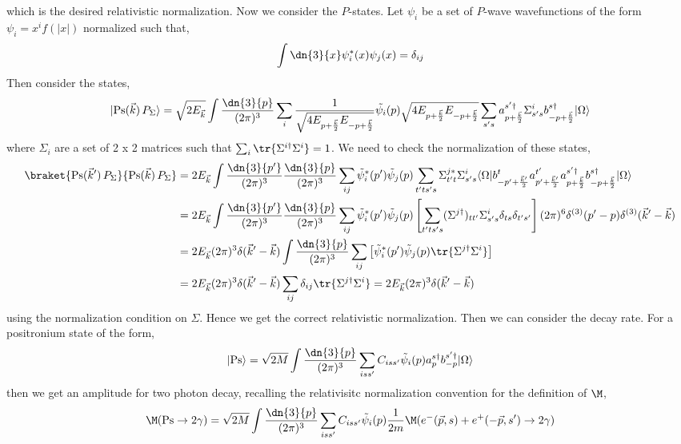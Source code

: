 \documentclass[12pt]{article}
\DeclarePairedDelimiter\bra{\langle}{\rvert}
\DeclarePairedDelimiter\ket{\lvert}{\rangle}
\begin{document}
which is the desired relativistic normalization. Now we consider the $P$-states. Let $\psi_i$ be a set of $P$-wave wavefunctions of the form $\psi_i = x^i f(|x|)$ normalized such that,
\[ \int \dn{3}{x} \psi_i^*(x) \psi_j(x) = \delta_{ij} \]
Then consider the states,
\[ \ket{\text{Ps}(\vec{k}) \, P_{\Sigma}} = \sqrt{2 E_{\vec{k}}} \int \frac{\dn{3}{p}}{(2 \pi)^3} \sum_i \frac{1}{\sqrt{4 E_{p+\frac{\vec{k}}{2}} E_{-p+\frac{\vec{k}}{2}}}} \tilde{\psi_i}(p) \sqrt{4 E_{p+\frac{\vec{k}}{2}} E_{-p+\frac{\vec{k}}{2}}} \sum_{s's} a_{p + \frac{\vec{k}}{2}}^{s' \dagger} \Sigma^i_{s's} b_{-p + \frac{\vec{k}}{2}}^{s \dagger} \ket{\Omega}   \]
where $\Sigma_i$ are a set of 2 x 2 matrices such that $\sum_i \tr{\Sigma^{i \dagger} \Sigma^i} = 1$. We need to check the normalization of these states,
\begin{align*}
\braket{\text{Ps}(\vec{k}') \, P_{\Sigma}}{\text{Ps}(\vec{k}) \, P_{\Sigma}} & = 2 E_{\vec{k}} \int \frac{\dn{3}{p'}}{(2 \pi)^3} \frac{\dn{3}{p}}{(2 \pi)^3} \sum_{ij} \tilde{\psi}_i^*(p') \tilde{\psi}_j(p) \sum_{t' t s' s} \Sigma^{j *}_{t' t} \Sigma^i_{s' s} \bra{\Omega} b_{-p' + \frac{\vec{k}'}{2}}^t  a^{t'}_{p' + \frac{\vec{k}'}{2}} a^{s' \dagger}_{p + \frac{\vec{k}}{2}}  b^{s \dagger}_{-p + \frac{\vec{k}}{2}} \ket{\Omega} 
\\
& = 2 E_{\vec{k}} \int \frac{\dn{3}{p'}}{(2 \pi)^3} \frac{\dn{3}{p}}{(2 \pi)^3} \sum_{ij} \tilde{\psi}_i^*(p') \tilde{\psi}_j(p) \left[ \sum_{t' t s' s} (\Sigma^{j \dagger})_{t t'} \Sigma^i_{s' s} \delta_{t s} \delta_{t' s'} \right] (2 \pi)^6 \delta^{(3)}(p'-p) \delta^{(3)}(\vec{k}'-\vec{k})
\\
& = 2 E_{\vec{k}} (2 \pi)^3 \delta(\vec{k}'-\vec{k}) \int \frac{\dn{3}{p}}{(2 \pi)^3} \sum_{ij} \left[ \tilde{\psi}_i^*(p') \tilde{\psi}_j(p) \tr{\Sigma^{j \dagger} \Sigma^i} \right]
\\
& = 2 E_{\vec{k}} (2 \pi)^3 \delta(\vec{k}'-\vec{k}) \sum_{ij} \delta_{ij} \tr{\Sigma^{j \dagger} \Sigma^i} = 2 E_{\vec{k}} (2 \pi)^3 \delta(\vec{k}'-\vec{k}) 
\end{align*}
using the normalization condition on $\Sigma$. Hence we get the correct relativistic normalization. Then we can consider the decay rate. For a positronium state of the form,
\[ \ket{\text{Ps}} = \sqrt{2 M} \int \frac{\dn{3}{p}}{(2 \pi)^3} \sum_{iss'} C_{i s s'} \tilde{\psi}_i(p) a^{s \dagger}_{p} b^{s' \dagger}_{-p} \ket{\Omega}  \]
then we get an amplitude for two photon decay, recalling the relativisitc normalization convention for the definition of $\M$,
\[ \M(\text{Ps} \to 2 \gamma)  = \sqrt{2 M} \int  \frac{\dn{3}{p}}{(2 \pi)^3} \sum_{iss'} C_{i s s'} \tilde{\psi}_i(p) \frac{1}{2 m} \M(e^- (\vec{p},s) + e^{+}(-\vec{p},s') \to 2 \gamma) \]
\end{document}
